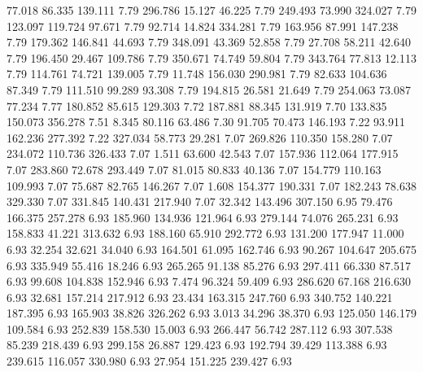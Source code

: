   77.018   86.335  139.111         7.79
 296.786   15.127   46.225         7.79
 249.493   73.990  324.027         7.79
 123.097  119.724   97.671         7.79
  92.714   14.824  334.281         7.79
 163.956   87.991  147.238         7.79
 179.362  146.841   44.693         7.79
 348.091   43.369   52.858         7.79
  27.708   58.211   42.640         7.79
 196.450   29.467  109.786         7.79
 350.671   74.749   59.804         7.79
 343.764   77.813   12.113         7.79
 114.761   74.721  139.005         7.79
  11.748  156.030  290.981         7.79
  82.633  104.636   87.349         7.79
 111.510   99.289   93.308         7.79
 194.815   26.581   21.649         7.79
 254.063   73.087   77.234         7.77
 180.852   85.615  129.303         7.72
 187.881   88.345  131.919         7.70
 133.835  150.073  356.278         7.51
   8.345   80.116   63.486         7.30
  91.705   70.473  146.193         7.22
  93.911  162.236  277.392         7.22
 327.034   58.773   29.281         7.07
 269.826  110.350  158.280         7.07
 234.072  110.736  326.433         7.07
   1.511   63.600   42.543         7.07
 157.936  112.064  177.915         7.07
 283.860   72.678  293.449         7.07
  81.015   80.833   40.136         7.07
 154.779  110.163  109.993         7.07
  75.687   82.765  146.267         7.07
   1.608  154.377  190.331         7.07
 182.243   78.638  329.330         7.07
 331.845  140.431  217.940         7.07
  32.342  143.496  307.150         6.95
  79.476  166.375  257.278         6.93
 185.960  134.936  121.964         6.93
 279.144   74.076  265.231         6.93
 158.833   41.221  313.632         6.93
 188.160   65.910  292.772         6.93
 131.200  177.947   11.000         6.93
  32.254   32.621   34.040         6.93
 164.501   61.095  162.746         6.93
  90.267  104.647  205.675         6.93
 335.949   55.416   18.246         6.93
 265.265   91.138   85.276         6.93
 297.411   66.330   87.517         6.93
  99.608  104.838  152.946         6.93
   7.474   96.324   59.409         6.93
 286.620   67.168  216.630         6.93
  32.681  157.214  217.912         6.93
  23.434  163.315  247.760         6.93
 340.752  140.221  187.395         6.93
 165.903   38.826  326.262         6.93
   3.013   34.296   38.370         6.93
 125.050  146.179  109.584         6.93
 252.839  158.530   15.003         6.93
 266.447   56.742  287.112         6.93
 307.538   85.239  218.439         6.93
 299.158   26.887  129.423         6.93
 192.794   39.429  113.388         6.93
 239.615  116.057  330.980         6.93
  27.954  151.225  239.427         6.93
